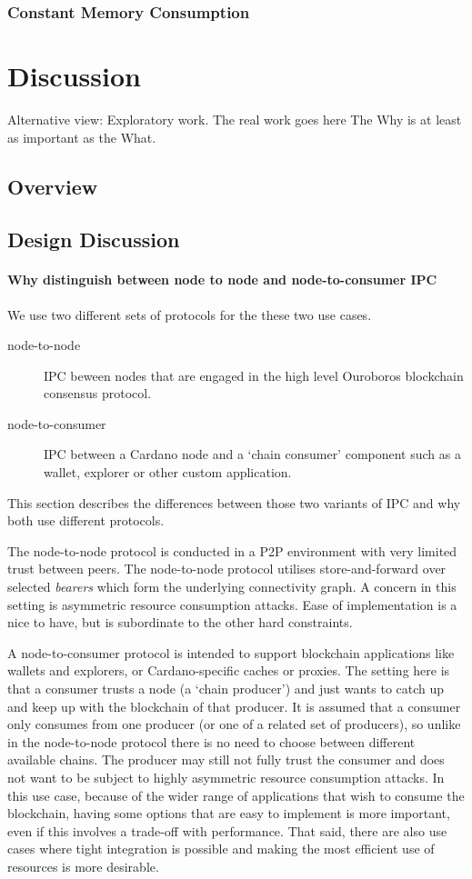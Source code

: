 \documentclass{report}
\theoremstyle{definition}{
  \newtheorem{lemma}{Lemma}[section] %
  \newtheorem{definition}[lemma]{Definition}
}
\theoremstyle{theorem}{
  \newtheorem{invariant}[lemma]{Invariant}
  \newtheorem{proofobligation}[lemma]{Proof Obligation}
}
\numberwithin{equation}{lemma}
\begin{document}
\subsection{Constant Memory Consumption}

\chapter{Discussion}
Alternative view: Exploratory work.
The real work goes here
The Why is at least as important as the What.
\section{Overview}
\section{Design Discussion}
\subsubsection{Why distinguish between node to node and node-to-consumer IPC}
\label{why_distinguish_protocols}
We use two different sets of protocols for the these two use cases.

\begin{description}
\item[node-to-node] IPC beween nodes that are engaged in the high level Ouroboros
      blockchain consensus protocol.
\item[node-to-consumer] IPC between a Cardano node and a `chain consumer' component such as a
      wallet, explorer or other custom application.
\end{description}

This section describes the differences between those two variants of IPC and why both use
different protocols.

The node-to-node protocol is conducted in a P2P environment
with very limited trust between peers. The node-to-node protocol utilises
store-and-forward over selected \emph{bearers} which form the underlying
connectivity graph. A concern in this setting is asymmetric resource consumption
attacks. Ease of implementation is a nice to have, but is subordinate to the
other hard constraints.

A node-to-consumer protocol is intended to support blockchain applications
like wallets and explorers, or Cardano-specific caches or proxies. The setting
here is that a consumer trusts a node (a `chain producer') and just wants to
catch up and keep up with the blockchain of that producer. It is assumed that
a consumer only consumes from one producer (or one of a related set of
producers), so unlike in the node-to-node protocol there is no need to choose
between different available chains. The producer may still not fully trust the
consumer and does not want to be subject to highly asymmetric resource
consumption attacks. In this use case, because of the wider range of
applications that wish to consume the blockchain, having some options that are
easy to implement is more important, even if this involves a trade-off with
performance. That said, there are also use cases where tight integration is
possible and making the most efficient use of resources is more desirable.
\end{document}

